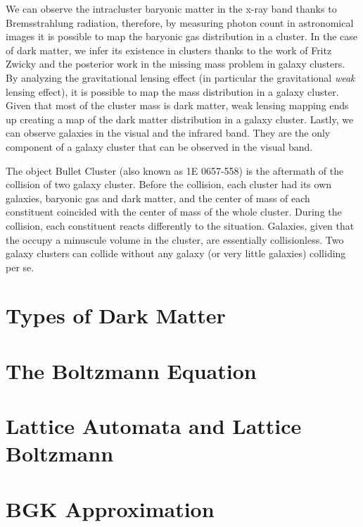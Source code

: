 We can observe the intracluster baryonic matter in the x-ray band thanks to Bremsstrahlung radiation, therefore, by measuring photon count in astronomical images it is possible to map the baryonic gas distribution in a cluster.
In the case of dark matter, we infer its existence in clusters thanks to the work of Fritz Zwicky and the posterior work in the missing mass problem in galaxy clusters. By analyzing the gravitational lensing effect (in particular the gravitational \emph{weak} lensing effect), it is possible to map the mass distribution in a galaxy cluster. Given that most of the cluster mass is dark matter, weak lensing mapping ends up creating a map of the dark matter distribution in a galaxy cluster.
Lastly, we can observe galaxies in the visual and the infrared band.
They are the only component of a galaxy cluster that can be observed in the visual band.


The object Bullet Cluster (also known as 1E 0657-558) is the aftermath of the collision of two galaxy cluster.
Before the collision, each cluster had its own galaxies, baryonic gas and dark matter, and the center of mass of each constituent coincided with the center of mass of the whole cluster.
During the collision, each constituent reacts differently to the situation.
Galaxies, given that the occupy a minuscule volume in the cluster, are essentially collisionless. Two galaxy clusters can collide without any galaxy (or very little galaxies) colliding per se.






\section{Types of Dark Matter}

\section{The Boltzmann Equation}

\section{Lattice Automata and Lattice Boltzmann}

\section{BGK Approximation}
\label{bgk}
